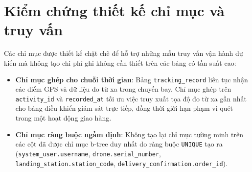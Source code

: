 \section{Kiểm chứng thiết kế chỉ mục và truy vấn}\label{s:indexval}

Các chỉ mục được thiết kế chặt chẽ để hỗ trợ những mẫu truy vấn vận hành dự kiến mà không tạo chi phí ghi không cần thiết trên các bảng có tần suất cao:

\begin{itemize}
\item \textbf{Chỉ mục ghép cho chuỗi thời gian}: Bảng \texttt{tracking\_record} liên tục nhận các điểm GPS và dữ liệu đo từ xa trong chuyến bay. Chỉ mục ghép trên \texttt{activity\_id} và \texttt{recorded\_at} tối ưu việc truy xuất tọa độ đo từ xa gần nhất cho bảng điều khiển giám sát trực tiếp, đồng thời giới hạn phạm vi quét trong một hoạt động giao hàng.
\item \textbf{Chỉ mục ràng buộc ngầm định}: Không tạo lại chỉ mục tường minh trên các cột đã được chỉ mục b-tree duy nhất do ràng buộc \texttt{UNIQUE} tạo ra (\texttt{system\_user.username}, \texttt{drone.serial\_number}, \texttt{landing\_station.station\_code}, \texttt{delivery\_confirmation.order\_id}).
\end{itemize}

